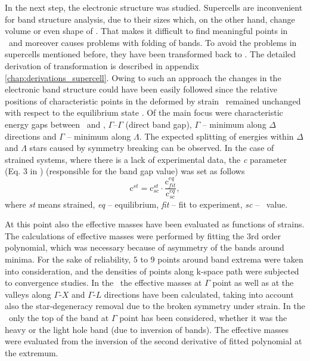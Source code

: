 In the next step, the electronic structure was studied.
Supercells are inconvenient for band structure analysis, due to their sizes which, on the other hand, change volume or even shape of \BZ.
That makes it difficult to find meaningful points in \BZ\ and moreover causes problems with folding of bands.
To avoid the problems in supercells mentioned before, they have been transformed back to \prim.
The detailed derivation of transformation is described in appendix \ref{chap:derivations_supercell}.
Owing to such an approach the changes in the electronic band structure could have been easily followed since the relative positions of characteristic points in the deformed by strain \BZ\ remained unchanged with respect to the equilibrium state \BZ.
Of the main focus were characteristic energy gaps between \VB\ and \CB, $\Gamma$--$\Gamma$ (direct band gap), $\Gamma$ -- minimum along $\Delta$ directions and $\Gamma$ -- minimum along $\Lambda$.
The expected splitting of energies within $\Delta$ and  $\Lambda$ stars caused by symmetry breaking can be observed.
In the case of strained systems, where there is a lack of experimental data, the \textit{c} parameter (Eq. 3 in \cite{mBJLDA}) (responsible for the band gap value) was set as follows
\begin{equation}
\text{c}^{st}=\text{c}^{st}_{sc}\cdot\frac{\text{c}^{eq}_{fit}}{\text{c}^{eq}_{sc}},
\label{Eq:ctbo9}
\end{equation}
where \textit{st} means strained, \textit{eq} -- equilibrium, \textit{fit} -- fit to experiment, \textit{sc} -- \SC\ value.

At this point also the effective masses have been evaluated as functions of strains.
The calculations of effective masses were performed by fitting the 3rd order polynomial, which was necessary because of asymmetry of the bands around minima.
For the sake of reliability, $5$ to $9$ points around band extrema were taken into consideration, and the densities of points along k-space path were subjected to convergence studies.
In the \CB\ the effective masses at $\Gamma$ point as well as at the valleys along $\Gamma$-$X$ and $\Gamma$-$L$ directions have been calculated, taking into account also the star-degeneracy removal due to the broken symmetry under strain.
In the \VB\ only the top of the band at $\Gamma$ point has been considered, whether it was the heavy or the light hole band (due to inversion of bands).
The effective masses were evaluated from the inversion of the second derivative of fitted polynomial at the extremum.

